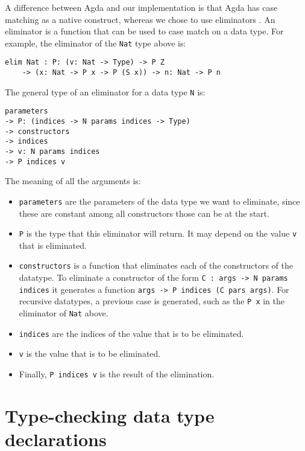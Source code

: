 A difference between Agda and our implementation is that Agda has case matching as a native construct, whereas we chose to use eliminators . An eliminator is a function that can be used to case match on a data type. For example, the eliminator of the \verb|Nat| type above is:
\begin{lstlisting}
elim Nat : P: (v: Nat -> Type) -> P Z 
	-> (x: Nat -> P x -> P (S x)) -> n: Nat -> P n
\end{lstlisting}

The general type of an eliminator for a data type \verb|N| is:
\begin{lstlisting}
parameters 
-> P: (indices -> N params indices -> Type) 
-> constructors
-> indices
-> v: N params indices
-> P indices v
\end{lstlisting}
The meaning of all the arguments is:
\begin{itemize}
	\item \verb|parameters| are the parameters of the data type we want to eliminate, since these are constant among all constructors those can be at the start.
	\item \verb|P| is the type that this eliminator will return. It may depend on the value \verb|v| that is eliminated.
	\item \verb|constructors| is a function that eliminates each of the constructors of the datatype. To eliminate a constructor of the form \verb|C : args -> N params indices| it generates a function \verb|args -> P indices (C pars args)|. For recursive datatypes, a previous case is generated, such as the \verb|P x| in the eliminator of \verb|Nat| above.
	\item \verb|indices| are the indices of the value that is to be eliminated.
	\item \verb|v| is the value that is to be eliminated.
	\item Finally, \verb|P indices v| is the result of the elimination.
\end{itemize}

\section{Type-checking data type declarations}
\label{ch:datatypes:typechecking}

